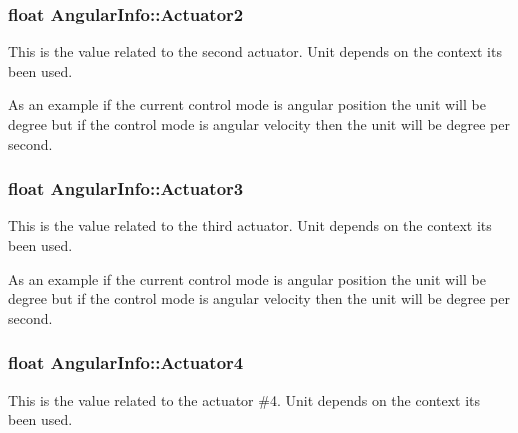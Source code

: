 \subsubsection[{\texorpdfstring{Actuator2}{Actuator2}}]{\setlength{\rightskip}{0pt plus 5cm}float Angular\+Info\+::\+Actuator2\hspace{0.3cm}{\ttfamily [inherited]}}\hypertarget{structAngularInfo_ab7b9349eef239f9741d9c28a795e4c35}{}\label{structAngularInfo_ab7b9349eef239f9741d9c28a795e4c35}


This is the value related to the second actuator. Unit depends on the context it\textquotesingle{}s been used. 

As an example if the current control mode is angular position the unit will be degree but if the control mode is angular velocity then the unit will be degree per second. 
\subsubsection[{\texorpdfstring{Actuator3}{Actuator3}}]{\setlength{\rightskip}{0pt plus 5cm}float Angular\+Info\+::\+Actuator3\hspace{0.3cm}{\ttfamily [inherited]}}\hypertarget{structAngularInfo_a30426eab94c82cfd3d697bbc8c506c2a}{}\label{structAngularInfo_a30426eab94c82cfd3d697bbc8c506c2a}


This is the value related to the third actuator. Unit depends on the context it\textquotesingle{}s been used. 

As an example if the current control mode is angular position the unit will be degree but if the control mode is angular velocity then the unit will be degree per second. 
\subsubsection[{\texorpdfstring{Actuator4}{Actuator4}}]{\setlength{\rightskip}{0pt plus 5cm}float Angular\+Info\+::\+Actuator4\hspace{0.3cm}{\ttfamily [inherited]}}\hypertarget{structAngularInfo_a46a1314c4846de6a495310b44fe5e0c3}{}\label{structAngularInfo_a46a1314c4846de6a495310b44fe5e0c3}


This is the value related to the actuator \#4. Unit depends on the context it\textquotesingle{}s been used. 

